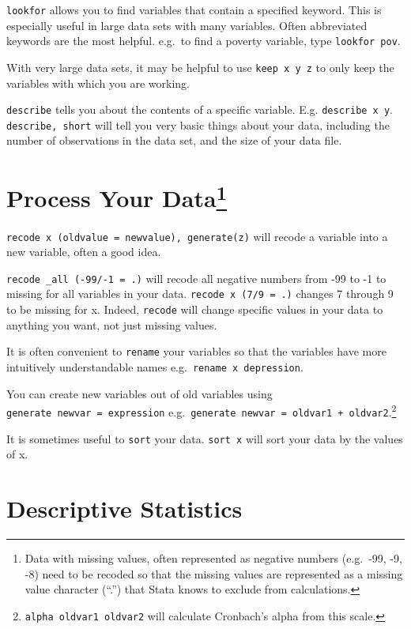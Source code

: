 \documentclass[11pt,nofonts,]{tufte-handout}
\begin{document}
\texttt{lookfor} allows you to find variables that contain a specified
keyword. This is especially useful in large data sets with many
variables. Often abbreviated keywords are the most helpful. e.g.~to find
a poverty variable, type \texttt{lookfor\ pov}.

With very large data sets, it may be helpful to use
\texttt{keep\ x\ y\ z} to only keep the variables with which you are
working.

\texttt{describe} tells you about the contents of a specific variable.
E.g. \texttt{describe\ x\ y}. \texttt{describe,\ short} will tell you
very basic things about your data, including the number of observations
in the data set, and the size of your data file.

\hypertarget{process-your-datamissing-values}{%
\section[Process Your Data]{\texorpdfstring{Process Your Data\footnote{Data
  with missing values, often represented as negative numbers (e.g.~-99,
  -9, -8) need to be recoded so that the missing values are represented
  as a missing value character (``.'') that Stata knows to exclude from
  calculations.}}{Process Your Data}}\label{process-your-datamissing-values}}

\texttt{recode\ x\ (oldvalue\ =\ newvalue),\ generate(z)} will recode a
variable into a new variable, often a good idea.

\texttt{recode\ \_all\ (-99/-1\ =\ .)} will recode all negative numbers
from -99 to -1 to missing for all variables in your data.
\texttt{recode\ x\ (7/9\ =\ .)} changes 7 through 9 to be missing for x.
Indeed, \texttt{recode} will change specific values in your data to
anything you want, not just missing values.

It is often convenient to \texttt{rename} your variables so that the
variables have more intuitively understandable names
e.g.~\texttt{rename\ x\ depression}.

You can create new variables out of old variables using
\texttt{generate\ newvar\ =\ expression}
e.g.~\texttt{generate\ newvar\ =\ oldvar1\ +\ oldvar2}.\footnote{\texttt{alpha\ oldvar1\ oldvar2}
  will calculate Cronbach's alpha from this scale.}

It is sometimes useful to \texttt{sort} your data. \texttt{sort\ x} will
sort your data by the values of x.

\hypertarget{descriptive-statistics}{%
\section{Descriptive Statistics}\label{descriptive-statistics}}
\end{document}

